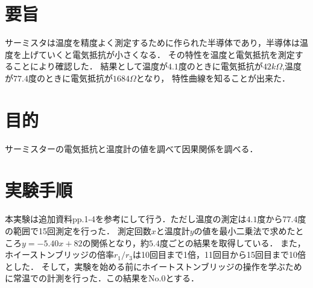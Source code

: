 \documentclass[a4paper,11pt]{ltjsarticle}
\begin{document}
\section{要旨}
サーミスタは温度を精度よく測定するために作られた半導体であり，半導体は温度を上げていくと電気抵抗が小さくなる．
その特性を温度と電気抵抗を測定することにより確認した．
結果として温度が$4.1$度のときに電気抵抗が$42kΩ$,温度が$77.4$度のときに電気抵抗が$1684Ω$となり，
特性曲線を知ることが出来た．
\section{目的}
サーミスターの電気抵抗と温度計の値を調べて因果関係を調べる．
\section{実験手順}
本実験は追加資料pp.1-4を参考にして行う．ただし温度の測定は$4.1$度から$77.4$度の範囲で15回測定を行った．
測定回数$x$と温度計$y$の値を最小二乗法で求めたところ$y=-5.40x + 82$の関係となり，約$5.4$度ごとの結果を取得している．
また，ホイーストンブリッジの倍率$r_1/r_3$は10回目まで1倍，11回目から15回目まで10倍とした．
そして，実験を始める前にホイートストンブリッジの操作を学ぶために常温での計測を行った．この結果をNo.0とする．
\end{document}
